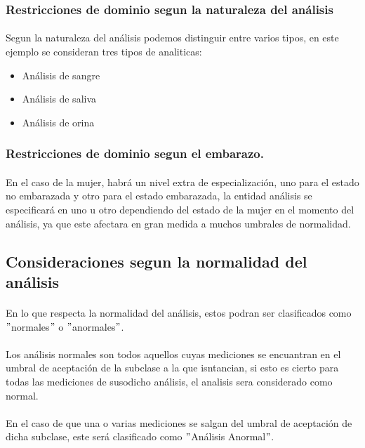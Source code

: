 \documentclass[a4paper,10pt]{article}
\begin{document}
\subsubsection{Restricciones de dominio segun la naturaleza del análisis}
\paragraph{}
Segun la naturaleza del análisis podemos distinguir entre varios tipos, en este ejemplo se consideran tres tipos de analiticas:
\begin{itemize}
	\item Análisis de sangre
	\item Análisis de saliva
	\item Análisis de orina
\end{itemize}
\subsubsection{Restricciones de dominio segun el embarazo.}
\paragraph{}
En el caso de la mujer, habrá un nivel extra de especialización, uno para el estado no embarazada y otro para el estado embarazada, la entidad análisis se especificará en uno u otro dependiendo del estado de la mujer en el momento del análisis, ya que este afectara en gran medida a muchos umbrales de normalidad.
\pagebreak
\subsection{Consideraciones segun la normalidad del análisis}
\paragraph{}
En lo que respecta la normalidad del análisis, estos podran ser clasificados como $"$normales$"$ o $"$anormales$"$.
\paragraph{}
Los análisis normales son todos aquellos cuyas mediciones se encuantran en el umbral de aceptación de la subclase a la que isntancian, si esto es cierto para todas las mediciones de susodicho análisis, el analisis sera considerado como normal.
\paragraph{}
En el caso de que una o varias mediciones se salgan del umbral de aceptación de dicha subclase, este será clasificado como $"$Análisis Anormal$"$.
\end{document}
